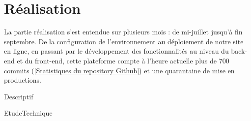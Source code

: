 \chapter{Réalisation}

La partie réalisation s'est entendue sur plusieurs mois : de mi-juillet jusqu'à fin septembre. De la configuration de l'environnement au déploiement de notre site en ligne, en passant par le développement des fonctionnalités au niveau du back-end et du front-end, cette plateforme compte à l'heure actuelle plus de 700 commits (\ref{Statistiques du repository Github}) et une quarantaine de mise en productions.\newline

{Descriptif}

{EtudeTechnique}



